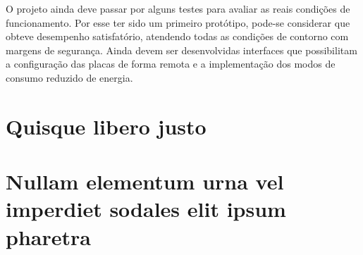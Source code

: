 \documentclass[
	12pt,				%
	openright,			%
	twoside,			%
	a4paper,			%
	english,			%
	french,				%
	spanish,			%
	brazil,				%
	]{abntex2}
\begin{document}
	O projeto ainda deve passar por alguns testes para avaliar as reais
	condições de funcionamento. Por esse ter sido um primeiro protótipo,
	pode-se considerar que obteve desempenho satisfatório, atendendo
	todas as condições de contorno com margens de segurança. Ainda devem
	ser desenvolvidas interfaces que possibilitam a configuração das
	placas de forma remota e a implementação dos modos de consumo
	reduzido de energia.

% 

\postextual

% 



\begin{apendicesenv}

\partapendices

\chapter{Quisque libero justo}


\chapter{Nullam elementum urna vel imperdiet sodales elit ipsum pharetra}

\end{apendicesenv}

\end{document}
